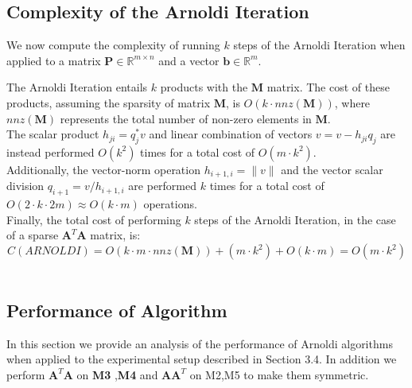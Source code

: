\documentclass{article}
\numberwithin{equation}{section}
\begin{document}
\subsection{Complexity of the Arnoldi Iteration}

We now compute the complexity of running $k$ steps of the Arnoldi Iteration when applied to a matrix $\boldsymbol{P} \in \mathbb R^{m \times n}$ and a vector $\boldsymbol{b} \in \mathbb R^m$. 

The Arnoldi Iteration entails $k$ products with the $\boldsymbol{M}$ matrix. The cost of these products, assuming the sparsity of matrix $\boldsymbol{M}$, is $O(k \cdot nnz(\boldsymbol{M}))$, where $nnz(\boldsymbol{M})$ represents the total number of non-zero elements in $\boldsymbol M$. \\

The scalar product $h_{ji}=q_j^*v$ and linear combination of vectors $v=v-h_{ji}q_j$ are instead performed $O(k^2)$ times for a total cost of $O(m \cdot k^2)$.\\  

Additionally, the vector-norm operation $h_{i+1,i}=\|v\|$ and the vector scalar division $q_{i+1}= v/h_{i+1,i}$ are performed $k$ times for a total cost of $O(2\cdot k \cdot 2m) \approx O(k\cdot m)$ operations.  \\

Finally, the total cost of performing $k$ steps of the Arnoldi Iteration, in the case of a sparse $\boldsymbol{A}^T \boldsymbol{A}$ matrix, is:
\begin{equation}
    C(ARNOLDI)= O(k \cdot m \cdot nnz(\boldsymbol{M})) + (m \cdot k^2) + O(k\cdot m)= O(m\cdot k^2)
\end{equation}  \\

\subsection{Performance of Algorithm}
In this section we provide an analysis of the performance of Arnoldi algorithms  when applied to the experimental setup described in Section 3.4. In addition we perform $\boldsymbol{A}^T\boldsymbol{A}$ on {\textbf{M3}} ,{\textbf{M4}} and $\boldsymbol{AA}^T$ on {M2},{M5} to make them symmetric.
\end{document}
